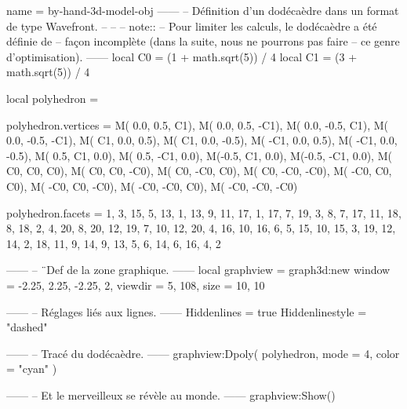 \documentclass{standalone}
\begin{document}
\begin{luadraw}{name = by-hand-3d-model-obj}
------
-- Définition d'un dodécaèdre dans un format de type Wavefront.
--
--
-- note::
--     Pour limiter les calculs, le dodécaèdre a été définie de
--     façon incomplète (dans la suite, nous ne pourrons pas faire
--     ce genre d'optimisation).
------
local C0 = (1 + math.sqrt(5)) / 4
local C1 = (3 + math.sqrt(5)) / 4

local polyhedron = {}

polyhedron.vertices = {
  M( 0.0,  0.5,   C1),
  M( 0.0,  0.5,  -C1),
  M( 0.0, -0.5,   C1),
  M( 0.0, -0.5,  -C1),
  M(  C1,  0.0,  0.5),
  M(  C1,  0.0, -0.5),
  M( -C1,  0.0,  0.5),
  M( -C1,  0.0, -0.5),
  M( 0.5,   C1,  0.0),
  M( 0.5,  -C1,  0.0),
  M(-0.5,   C1,  0.0),
  M(-0.5,  -C1,  0.0),
  M(  C0,   C0,   C0),
  M(  C0,   C0,  -C0),
  M(  C0,  -C0,   C0),
  M(  C0,  -C0,  -C0),
  M( -C0,   C0,   C0),
  M( -C0,   C0,  -C0),
  M( -C0,  -C0,   C0),
  M( -C0,  -C0,  -C0)
}

polyhedron.facets = {
  {  1,  3, 15,  5, 13},
  {  1, 13,  9, 11, 17},
  {  1, 17,  7, 19,  3},
  {  8,  7, 17, 11, 18},
  {  8, 18,  2,  4, 20},
  {  8, 20, 12, 19,  7},
  { 10, 12, 20,  4, 16},
  { 10, 16,  6,  5, 15},
  { 10, 15,  3, 19, 12},
  { 14,  2, 18, 11,  9},
  { 14,  9, 13,  5,  6},
  { 14,  6, 16,  4,  2}
}

------
-- ¨Def de la zone graphique.
------
local graphview = graph3d:new{
  window  = {-2.25, 2.25, -2.25, 2},
  viewdir = {5, 108},
  size    = {10, 10}
}

------
-- Réglages liés aux lignes.
------
Hiddenlines     = true
Hiddenlinestyle = "dashed"

------
-- Tracé du dodécaèdre.
------
graphview:Dpoly(
  polyhedron,
  {
    mode  = 4,
    color = "cyan"
  }
)

------
-- Et le merveilleux se révèle au monde.
------
graphview:Show()
\end{luadraw}
\end{document}
